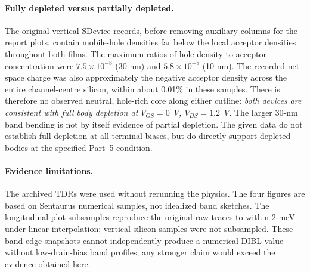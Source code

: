 \paragraph{Fully depleted versus partially depleted.}
The original vertical SDevice records, before
removing auxiliary columns for the report plots,
contain mobile-hole densities far below the
local acceptor densities throughout both films.
The maximum ratios of hole density to acceptor
concentration were $7.5\times10^{-8}$
(30 nm) and $5.8\times10^{-8}$ (10 nm).
The recorded net space charge was also
approximately the negative acceptor density
across the entire channel-centre silicon,
within about 0.01\% in these samples.
There is therefore no observed neutral,
hole-rich core along either cutline:
\emph{both devices are consistent with full
body depletion at $V_{GS}=0$ V,
$V_{DS}=1.2$ V}. The larger 30-nm band
bending is not by itself evidence of
partial depletion. The given data do not
establish full depletion at all terminal
biases, but do directly support depleted
bodies at the specified Part~5 condition.

\paragraph{Evidence limitations.}
The archived TDRs were used without rerunning
the physics. The four figures are based on
Sentaurus numerical samples, not idealized
band sketches. The longitudinal plot
subsamples reproduce the original raw
traces to within 2 meV under linear
interpolation; vertical silicon samples
were not subsampled. These band-edge
snapshots cannot independently produce a
numerical DIBL value without low-drain-bias
band profiles; any stronger claim would
exceed the evidence obtained here.
